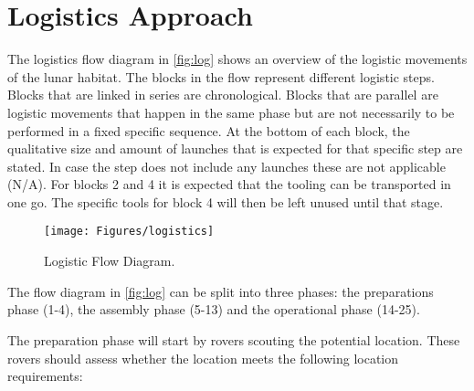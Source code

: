 \chapter{Logistics Approach}

\label{ch:log}








The logistics flow diagram in \autoref{fig:log} shows an overview of the logistic movements of the lunar habitat. The blocks in the flow represent different logistic steps. Blocks that are linked in series are chronological. Blocks that are parallel are logistic movements that happen in the same phase but are not necessarily to be performed in a fixed specific sequence.  At the bottom of each block, the qualitative size and amount of launches that is expected for that specific step are stated. In case the step does not include any launches these are not applicable (N/A). For blocks 2 and 4 it is expected that the tooling can be transported in one go. The specific tools for block 4 will then be left unused until that stage.



\begin{figure}[ht]

    \centering

    \vspace{1cm}

    \texttt{[image: Figures/logistics]}

    \caption{Logistic Flow Diagram.}

    \label{fig:log}

\end{figure}



The flow diagram in \autoref{fig:log} can be split into three phases: the preparations phase (1-4), the assembly phase (5-13) and the operational phase (14-25).\\

\newpage

The preparation phase will start by rovers scouting the potential location. These rovers should assess whether the location meets the following location requirements:\\



